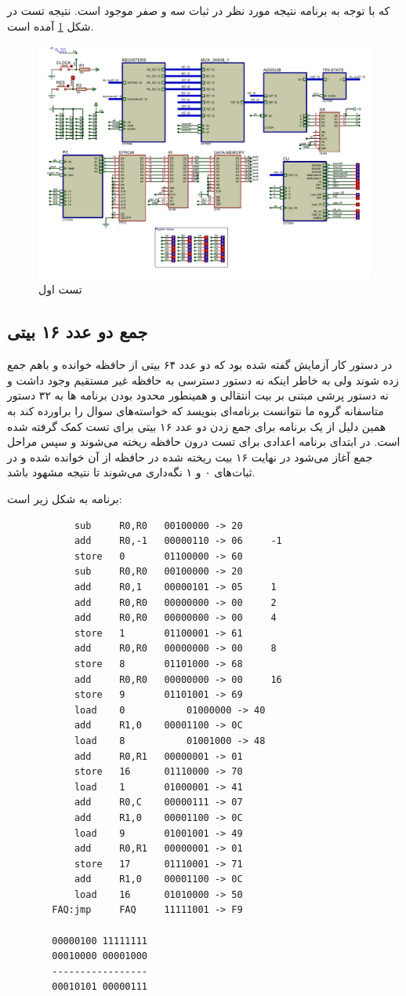 \documentclass{article}
\begin{document}
که با توجه به برنامه نتیجه مورد نظر در ثبات سه و صفر موجود است. نتیجه تست در شکل \ref{fig:test1}
آمده است.

\begin{figure}
	\centering
	\includegraphics[scale=0.5,page=1]{./graphics/test1}
	\caption{تست اول}
	\label{fig:test1}
\end{figure}
\subsection{جمع دو عدد ۱۶ بیتی}
در دستور کار آزمایش گفته شده بود که دو عدد ۶۴ بیتی از حافظه خوانده و باهم جمع زده شوند ولی به خاطر اینکه نه دستور دسترسی به حافظه غیر مستقیم وجود داشت و نه دستور پرشی مبتنی بر بیت انتقالی و همینطور محدود بودن برنامه ها به ۳۲ دستور متاسفانه گروه ما نتوانست برنامه‌ای بنویسد که خواسته‌های سوال را براورده کند به همین دلیل از یک برنامه برای جمع زدن دو عدد ۱۶ بیتی برای تست کمک گرفته شده است. در ابتدای برنامه اعدادی برای تست درون حافظه ریخته می‌شوند و سپس مراحل جمع آغاز می‌شود در نهایت ۱۶ بیت ریخته شده در حافظه از آن خوانده شده و در ثبات‌های ۰ و ۱ نگه‌داری می‌شوند تا نتیجه مشهود باشد.

برنامه به شکل زیر است:
\begin{latin}
\begin{lstlisting}
			sub		R0,R0	00100000 -> 20
			add		R0,-1	00000110 -> 06     -1
			store   0		01100000 -> 60
			sub		R0,R0   00100000 -> 20
			add		R0,1	00000101 -> 05     1
			add		R0,R0	00000000 -> 00     2
			add		R0,R0	00000000 -> 00     4
			store	1		01100001 -> 61
			add		R0,R0	00000000 -> 00	   8
			store	8		01101000 -> 68
			add		R0,R0   00000000 -> 00     16
			store	9 		01101001 -> 69
			load	0	        01000000 -> 40
			add		R1,0    00001100 -> 0C
			load	8      	    01001000 -> 48
			add		R0,R1	00000001 -> 01
			store	16		01110000 -> 70
			load	1		01000001 -> 41
			add		R0,C	00000111 -> 07
			add		R1,0	00001100 -> 0C
			load	9		01001001 -> 49
			add		R0,R1	00000001 -> 01
			store	17		01110001 -> 71
			add		R1,0	00001100 -> 0C
			load	16		01010000 -> 50
		FAQ:jmp		FAQ		11111001 -> F9
		
		00000100 11111111
		00010000 00001000
		-----------------
		00010101 00000111
\end{lstlisting}
\end{latin}
\end{document}
